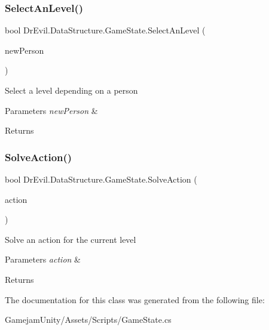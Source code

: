 \subsubsection{\texorpdfstring{Select\+An\+Level()}{SelectAnLevel()}}
{\footnotesize\ttfamily bool Dr\+Evil.\+Data\+Structure.\+Game\+State.\+Select\+An\+Level (\begin{DoxyParamCaption}\item[{\mbox{\hyperlink{class_person}{Person}}}]{new\+Person }\end{DoxyParamCaption})\hspace{0.3cm}{\ttfamily [inline]}}



Select a level depending on a person 


\begin{DoxyParams}{Parameters}
{\em new\+Person} & \\
\hline
\end{DoxyParams}
\begin{DoxyReturn}{Returns}

\end{DoxyReturn}
\mbox{\label{class_dr_evil_1_1_data_structure_1_1_game_state_a5d26d915d3a81df99b17402e49491a80}} 
\subsubsection{\texorpdfstring{Solve\+Action()}{SolveAction()}}
{\footnotesize\ttfamily bool Dr\+Evil.\+Data\+Structure.\+Game\+State.\+Solve\+Action (\begin{DoxyParamCaption}\item[{\mbox{\hyperlink{class_evil_action}{Evil\+Action}}}]{action }\end{DoxyParamCaption})\hspace{0.3cm}{\ttfamily [inline]}}



Solve an action for the current level 


\begin{DoxyParams}{Parameters}
{\em action} & \\
\hline
\end{DoxyParams}
\begin{DoxyReturn}{Returns}

\end{DoxyReturn}


The documentation for this class was generated from the following file\+:\begin{DoxyCompactItemize}
\item 
Gamejam\+Unity/\+Assets/\+Scripts/Game\+State.\+cs\end{DoxyCompactItemize}
